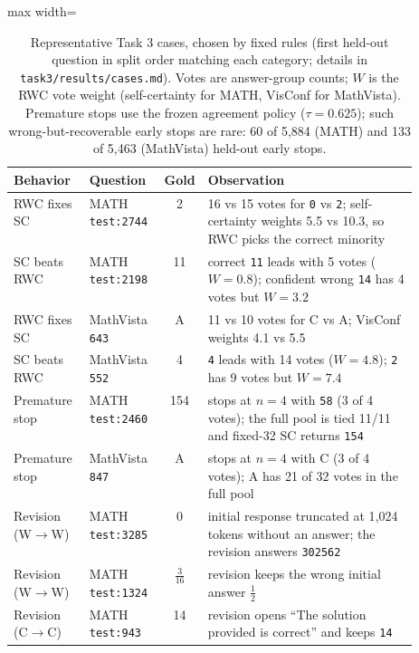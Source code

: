\begin{table}[htbp]
\centering
\footnotesize
\caption{Representative Task 3 cases, chosen by fixed rules (first held-out question in split order matching
each category; details in \texttt{task3/results/cases.md}). Votes are answer-group counts; $W$ is the RWC vote
weight (self-certainty for MATH, VisConf for MathVista). Premature stops use the frozen agreement policy
($\tau{=}0.625$); such wrong-but-recoverable early stops are rare: 60 of 5{,}884 (MATH) and 133 of 5{,}463
(MathVista) held-out early stops.}
\label{tab:t3-cases}
\begin{adjustbox}{max width=\linewidth}
\begin{tabular}{llcp{0.52\linewidth}}
\toprule
Behavior & Question & Gold & Observation \\
\midrule
RWC fixes SC & MATH \texttt{test:2744} & 2 & 16 vs 15 votes for \texttt{0} vs \texttt{2}; self-certainty weights 5.5 vs 10.3, so RWC picks the correct minority \\
SC beats RWC & MATH \texttt{test:2198} & 11 & correct \texttt{11} leads with 5 votes ($W{=}0.8$); confident wrong \texttt{14} has 4 votes but $W{=}3.2$ \\
RWC fixes SC & MathVista \texttt{643} & A & 11 vs 10 votes for C vs A; VisConf weights 4.1 vs 5.5 \\
SC beats RWC & MathVista \texttt{552} & 4 & \texttt{4} leads with 14 votes ($W{=}4.8$); \texttt{2} has 9 votes but $W{=}7.4$ \\
\midrule
Premature stop & MATH \texttt{test:2460} & 154 & stops at $n{=}4$ with \texttt{58} (3 of 4 votes); the full pool is tied 11/11 and fixed-32 SC returns \texttt{154} \\
Premature stop & MathVista \texttt{847} & A & stops at $n{=}4$ with C (3 of 4 votes); A has 21 of 32 votes in the full pool \\
\midrule
Revision (W$\to$W) & MATH \texttt{test:3285} & 0 & initial response truncated at 1{,}024 tokens without an answer; the revision answers \texttt{302562} \\
Revision (W$\to$W) & MATH \texttt{test:1324} & $\tfrac{3}{16}$ & revision keeps the wrong initial answer $\tfrac12$ \\
Revision (C$\to$C) & MATH \texttt{test:943} & 14 & revision opens ``The solution provided is correct'' and keeps \texttt{14} \\
\bottomrule
\end{tabular}
\end{adjustbox}
\end{table}
